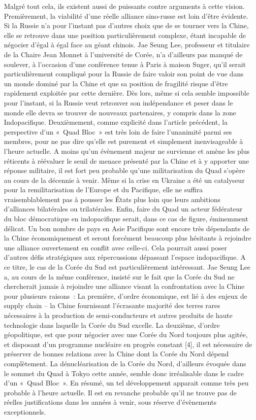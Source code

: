\documentclass[11pt,a4paper]{article}
\begin{document}
Malgré tout cela, ils existent aussi de puissants contre arguments à cette vision. Premièrement, la viabilité d'une réelle alliance sino-russe est loin d'être évidente. Si la Russie n'a pour l'instant pas d'autres choix que de se tourner vers la Chine, elle se retrouve dans une position particulièrement complexe, étant incapable de négocier d'égal à égal face au géant chinois. Jae Seung Lee, professeur et titulaire de la Chaire Jean Monnet à l'université de Corée, n'a d'ailleurs pas manqué de soulever, à l'occasion d'une conférence tenue à Paris à maison Suger, qu'il serait particulièrement compliqué pour la Russie de faire valoir son point de vue dans un monde dominé par la Chine et que sa position de fragilité risque d'être rapidement exploitée par cette dernière. Dès lors, même si cela semble impossible pour l'instant, si la Russie veut retrouver son indépendance et peser dans le monde elle devra se trouver de nouveaux partenaires, y compris dans la zone Indopacifique. Deuxièmement, comme explicité dans l'article précédent, la perspective d'un «~Quad Bloc~» est très loin de faire l'unanimité parmi ses membres, pour ne pas dire qu'elle est purement et simplement inenvisageable à l'heure actuelle. A moins qu'un évènement majeur ne survienne et amène les plus réticents à réévaluer le seuil de menace présenté par la Chine et à y apporter une réponse militaire, il est fort peu probable qu'une militarisation du Quad s'opère au cours de la décennie à venir. Même si la crise en Ukraine a été un catalyseur pour la remilitarisation de l'Europe et du Pacifique, elle ne suffira vraisemblablement pas à pousser les États plus loin que leurs ambitions d'alliances bilatérales ou trilatérales. Enfin, faire du Quad un acteur fédérateur du bloc démocratique en indopacifique serait, dans ce cas de figure, éminemment délicat. Un bon nombre de pays en Asie Pacifique sont encore très dépendants de la Chine économiquement et seront forcément beaucoup plus hésitants à rejoindre une alliance ouvertement en conflit avec celle-ci. Cela pourrait aussi poser d'autres défis stratégiques aux répercussions dépassant l'espace indopacifique. A ce titre, le cas de la Corée du Sud est particulièrement intéressant. Jae Seung Lee a, au cours de la même conférence, insisté sur le fait que la Corée du Sud ne chercherait jamais à rejoindre une alliance visant la confrontation avec la Chine pour plusieurs raisons~: La première, d'ordre économique, est lié à des enjeux de supply chain -- la Chine fournissant l'écrasante majorité des terres rares nécessaires à la production de semi-conducteurs et autres produits de haute technologie dans laquelle la Corée du Sud excelle. La deuxième, d'ordre géopolitique, est que pour négocier avec une Corée du Nord toujours plus agitée, et disposant d'un programme nucléaire en progrès constant {[}4{]}, il est nécessaire de préserver de bonnes relations avec la Chine dont la Corée du Nord dépend complètement. La dénucléarisation de la Corée du Nord, d'ailleurs évoquée dans le sommet du Quad à Tokyo cette année, semble donc irréalisable dans le cadre d'un «~Quad Bloc~». En résumé, un tel développement apparait comme très peu probable à l'heure actuelle. Il est en revanche probable qu'il ne trouve pas de réelles justifications dans les années à venir, sous réserve d'évènements exceptionnels.
\end{document}

